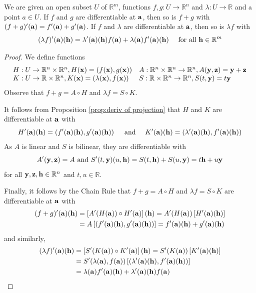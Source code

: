 \documentclass[a4paper]{article}
\begin{document}
\begin{corollary}
    We are given an open subset $U$ of $\mathbb{R}^{m}$, functions $f, g: U \rightarrow \mathbb{R}^{n}$ and $\lambda: U \rightarrow \mathbb{R}$ and a point $a \in U$. If $f$ and $g$ are differentiable at ${\bf a}$, then so is $f+g$ with $(f+g)^{\prime}({\bf a})=f^{\prime}({\bf a})+g^{\prime}({\bf a})$. If $f$ and $\lambda$ are differentiable at ${\bf a}$, then so is $\lambda f$ with
$$
(\lambda f)^{\prime}({\bf a})({\bf h})=\lambda^{\prime}({\bf a})({\bf h}) f({\bf a})+\lambda({\bf a}) f^{\prime}({\bf a})({\bf h}) \quad \text { for all } {\bf h} \in \mathbb{R}^{m}
$$
\end{corollary}
\begin{proof}
    We define functions
$$
\begin{array}{ll}
H: U \rightarrow \mathbb{R}^{n} \times \mathbb{R}^{n}, H({\bf x})=(f({\bf x}), g({\bf x})) & A: \mathbb{R}^{n} \times \mathbb{R}^{n} \rightarrow \mathbb{R}^{n}, A({\bf y}, {\bf z})={\bf y}+{\bf z} \\
K: U \rightarrow \mathbb{R} \times \mathbb{R}^{n}, K({\bf x})=(\lambda({\bf x}), f({\bf x})) & S: \mathbb{R} \times \mathbb{R}^{n} \rightarrow \mathbb{R}^{n}, S(t, {\bf y})=t {\bf y}
\end{array}
$$
Observe that $f+g=A \circ H$ and $\lambda f=S \circ K$.

It follows from Proposition \ref{prop:deriv of projection} that $H$ and $K$ are differentiable at ${\bf a}$ with
$$
H^{\prime}({\bf a})({\bf h})=\left(f^{\prime}({\bf a})({\bf h}), g^{\prime}({\bf a})({\bf h})\right) \quad \text { and } \quad K^{\prime}({\bf a})({\bf h})=\left(\lambda^{\prime}({\bf a})({\bf h}), f^{\prime}({\bf a})({\bf h})\right)
$$
As $A$ is linear and $S$ is bilinear, they are differentiable with
$$
A^{\prime}({\bf y}, {\bf z})=A \text { and } S^{\prime}(t, {\bf y})(u, {\bf h})=S(t, {\bf h})+S(u, {\bf y})=t {\bf h}+u {\bf y}
$$
for all ${\bf y}, {\bf z}, {\bf h} \in \mathbb{R}^{n}$ and $t, u \in \mathbb{R}$.

Finally, it follows by the Chain Rule that $f+g=A \circ H$ and $\lambda f=S \circ K$ are differentiable at ${\bf a}$ with
$$
\begin{aligned}
(f+g)^{\prime}({\bf a})({\bf h}) &=\left[A^{\prime}(H({\bf a})) \circ H^{\prime}({\bf a})\right]({\bf h})=A^{\prime}(H({\bf a}))\left[H^{\prime}({\bf a})({\bf h})\right] \\
&=A\left[\left(f^{\prime}({\bf a})({\bf h}), g^{\prime}({\bf a})({\bf h})\right)\right]=f^{\prime}({\bf a})({\bf h})+g^{\prime}({\bf a})({\bf h})
\end{aligned}
$$
and similarly,
\begin{align*}
(\lambda f)^{\prime}({\bf a})({\bf h}) &=\left[S^{\prime}(K({\bf a})) \circ K^{\prime}({\bf a})\right]({\bf h})=S^{\prime}(K({\bf a}))\left[K^{\prime}({\bf a})({\bf h})\right] \\
&=S^{\prime}(\lambda({\bf a}), f({\bf a}))\left[\left(\lambda^{\prime}({\bf a})({\bf h}), f^{\prime}({\bf a})({\bf h})\right)\right] \\
&=\lambda({\bf a}) f^{\prime}({\bf a})({\bf h})+\lambda^{\prime}({\bf a})({\bf h}) f({\bf a})\qedhere
\end{align*}
\end{proof}
\end{document}
